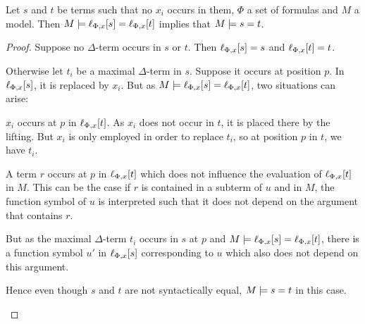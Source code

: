 \documentclass[,%
	paper=a4,%
	DIV14, 
	liststotoc,
	bibtotoc,
	draft=false,%
	numbers=noendperiod
]{scrartcl}
\begin{document}
\begin{lemma}
	Let $s$ and $t$ be terms such that no $x_i$ occurs in them, $\Phi$ a set of formulas and $M$ a model.
	Then $M\models \ell_{\Phi,x}[s] = \ell_{\Phi,x}[t]$ implies that $M\models s=t$.
	\label{lemma:lift_equality}
\end{lemma}
\begin{proof}
	Suppose no $\Delta$-term occurs in $s$ or $t$. Then $\ell_{\Phi,x}[s] = s$ 
	and $\ell_{\Phi,x}[t] = t$.

	Otherwise let $t_i$ be a maximal $\Delta$-term in $s$. Suppose it occurs at position $p$. In $\ell_{\Phi,x}[s]$, it is replaced by $x_i$.
	But as $M \models \ell_{\Phi,x}[s] = \ell_{\Phi,x}[t]$, two situations can arise:
	\begin{compactenum}
	\item $x_i$ occurs at $p$ in $\ell_{\Phi,x}[t]$.
		As $x_i$ does not occur in $t$, it is placed there by the lifting.
		But $x_i$ is only employed in order to replace $t_i$, so at position $p$ in $t$, we have $t_i$.
	\item A term $r$ occurs at $p$ in $\ell_{\Phi,x}[t]$ which does not influence the evaluation of $\ell_{\Phi,x}[t]$ in $M$. This can be the case if $r$ is contained in a subterm of $u$ and in $M$, the function symbol of $u$ is interpreted such that it does not depend on the argument that contains $r$.
		
		But as the maximal $\Delta$-term $t_i$ occurs in $s$ at $p$ and $M \models \ell_{\Phi,x}[s] = \ell_{\Phi,x}[t]$, there is a function symbol $u'$ in $\ell_{\Phi,x}[s]$ corresponding to $u$ which also does not depend on this argument.

		Hence even though $s$ and $t$ are not syntactically equal, $M\models s=t$ in this case. \qedhere
	\end{compactenum}

\end{proof}
\end{document}
